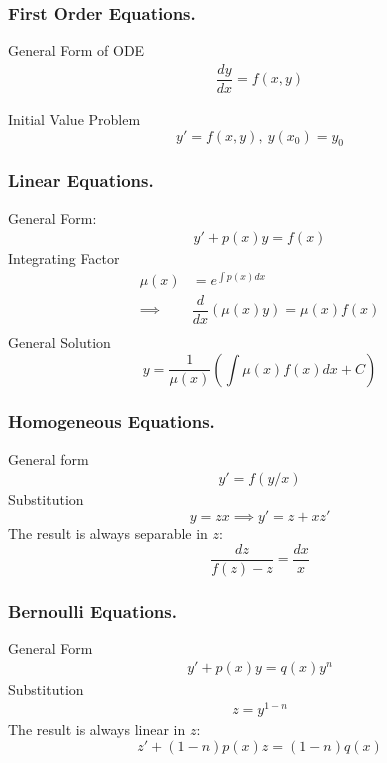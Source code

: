 \documentclass[../../main.tex]{subfiles}
\begin{document}
\subsubsection*{First Order Equations.} General Form of ODE
\begin{align*}
\dfrac{dy}{dx}=f(x,y)
\end{align*}

Initial Value Problem
\begin{equation*}
y'=f(x,y),\ y(x_0) = y_0
\end{equation*}

\subsubsection*{Linear Equations.} General Form:
\begin{align*}
y'+p(x)y=f(x)
\end{align*}
Integrating Factor
\begin{align*}
 \mu(x) &= e^{\int p(x)dx}\\
  \implies & \dfrac{d}{dx}\left( \mu(x) y \right) = \mu(x) f(x)\\
\end{align*}
General Solution
\begin{equation*}
y=\frac{1}{\mu(x)}\left( \int \mu(x) f(x) dx + C\right)
\end{equation*}

\subsubsection*{Homogeneous Equations.} General form
\begin{align*}
 y'=f(y/x)
\end{align*}
Substitution
\begin{equation*}
y=zx  \implies y'=z + xz'
\end{equation*}
The result is always separable in $z$: 
\begin{equation*}
\dfrac{dz}{f(z)-z} = \dfrac{dx}{x}
\end{equation*}

\subsubsection*{Bernoulli Equations.} General Form
\begin{align*}
y'+p(x)y=q(x)y^n
\end{align*}
Substitution
\begin{align*}
z = y^{1-n}
\end{align*}
The result is always linear in $z$:
\begin{equation*}
 z' +(1-n)p(x) z = (1-n)q(x)
\end{equation*}
\end{document}
